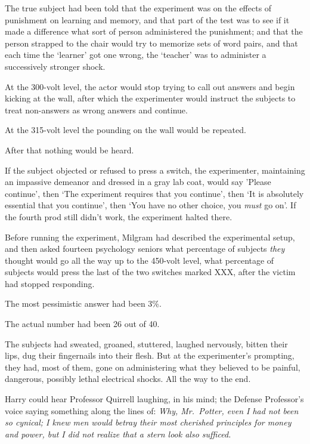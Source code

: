 The true subject had been told that the experiment was on the effects of 
punishment on learning and memory, and that part of the test was to see if it 
made a difference what sort of person administered the punishment; and that the 
person strapped to the chair would try to memorize sets of word pairs, and that 
each time the `learner' got one wrong, the `teacher' was to administer a 
successively stronger shock.

At the 300-volt level, the actor would stop trying to call out answers and 
begin kicking at the wall, after which the experimenter would instruct the 
subjects to treat non-answers as wrong answers and continue.

At the 315-volt level the pounding on the wall would be repeated.

After that nothing would be heard.

If the subject objected or refused to press a switch, the experimenter, 
maintaining an impassive demeanor and dressed in a gray lab coat, would say 
'Please continue', then `The experiment requires that you continue', then `It 
is absolutely essential that you continue', then `You have no other choice, you 
\emph{must} go on'. If the fourth prod still didn't work, the experiment halted 
there.

Before running the experiment, Milgram had described the experimental setup, 
and then asked fourteen psychology seniors what percentage of subjects 
\emph{they} thought would go all the way up to the 450-volt level, what 
percentage of subjects would press the last of the two switches marked XXX, 
after the victim had stopped responding.

The most pessimistic answer had been 3\%.

The actual number had been 26 out of 40.

The subjects had sweated, groaned, stuttered, laughed nervously, bitten their 
lips, dug their fingernails into their flesh. But at the experimenter's 
prompting, they had, most of them, gone on administering what they believed to 
be painful, dangerous, possibly lethal electrical shocks. All the way to the 
end.

Harry could hear Professor Quirrell laughing, in his mind; the Defense 
Professor's voice saying something along the lines of: \emph{Why, Mr.~Potter, 
even I had not been so cynical; I knew men would betray their most cherished 
principles for money and power, but I did not realize that a stern look also 
sufficed.}

